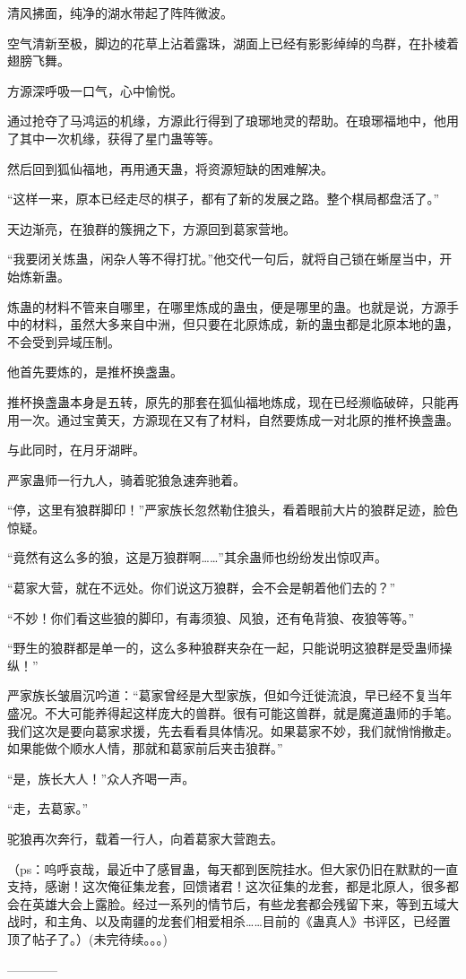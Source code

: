 \begin{this_body}
清风拂面，纯净的湖水带起了阵阵微波。

空气清新至极，脚边的花草上沾着露珠，湖面上已经有影影绰绰的鸟群，在扑棱着翅膀飞舞。

方源深呼吸一口气，心中愉悦。

通过抢夺了马鸿运的机缘，方源此行得到了琅琊地灵的帮助。在琅琊福地中，他用了其中一次机缘，获得了星门蛊等等。

然后回到狐仙福地，再用通天蛊，将资源短缺的困难解决。

“这样一来，原本已经走尽的棋子，都有了新的发展之路。整个棋局都盘活了。”

天边渐亮，在狼群的簇拥之下，方源回到葛家营地。

“我要闭关炼蛊，闲杂人等不得打扰。”他交代一句后，就将自己锁在蜥屋当中，开始炼新蛊。

炼蛊的材料不管来自哪里，在哪里炼成的蛊虫，便是哪里的蛊。也就是说，方源手中的材料，虽然大多来自中洲，但只要在北原炼成，新的蛊虫都是北原本地的蛊，不会受到异域压制。

他首先要炼的，是推杯换盏蛊。

推杯换盏蛊本身是五转，原先的那套在狐仙福地炼成，现在已经濒临破碎，只能再用一次。通过宝黄天，方源现在又有了材料，自然要炼成一对北原的推杯换盏蛊。

与此同时，在月牙湖畔。

严家蛊师一行九人，骑着驼狼急速奔驰着。

“停，这里有狼群脚印！”严家族长忽然勒住狼头，看着眼前大片的狼群足迹，脸色惊疑。

“竟然有这么多的狼，这是万狼群啊……”其余蛊师也纷纷发出惊叹声。

“葛家大营，就在不远处。你们说这万狼群，会不会是朝着他们去的？”

“不妙！你们看这些狼的脚印，有毒须狼、风狼，还有龟背狼、夜狼等等。”

“野生的狼群都是单一的，这么多种狼群夹杂在一起，只能说明这狼群是受蛊师操纵！”

严家族长皱眉沉吟道：“葛家曾经是大型家族，但如今迁徙流浪，早已经不复当年盛况。不大可能养得起这样庞大的兽群。很有可能这兽群，就是魔道蛊师的手笔。我们这次是要向葛家求援，先去看看具体情况。如果葛家不妙，我们就悄悄撤走。如果能做个顺水人情，那就和葛家前后夹击狼群。”

“是，族长大人！”众人齐喝一声。

“走，去葛家。”

驼狼再次奔行，载着一行人，向着葛家大营跑去。

（ps：呜呼哀哉，最近中了感冒蛊，每天都到医院挂水。但大家仍旧在默默的一直支持，感谢！这次俺征集龙套，回馈诸君！这次征集的龙套，都是北原人，很多都会在英雄大会上露脸。经过一系列的情节后，有些龙套都会残留下来，等到五域大战时，和主角、以及南疆的龙套们相爱相杀……目前的《蛊真人》书评区，已经置顶了帖子了。）(未完待续。。。)

------------

\end{this_body}

